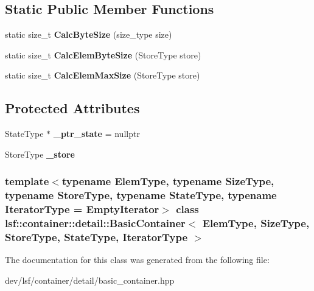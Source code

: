 \subsection*{Static Public Member Functions}
\begin{DoxyCompactItemize}
\item 
\hypertarget{classlsf_1_1container_1_1detail_1_1BasicContainer_afccd1538ff1ba8922ed600dcb570842d}{
static size\_\-t {\bfseries CalcByteSize} (size\_\-type size)}
\label{classlsf_1_1container_1_1detail_1_1BasicContainer_afccd1538ff1ba8922ed600dcb570842d}

\item 
\hypertarget{classlsf_1_1container_1_1detail_1_1BasicContainer_a11348ee3bb1cf14e62d5a4aa60496b2a}{
static size\_\-t {\bfseries CalcElemByteSize} (StoreType store)}
\label{classlsf_1_1container_1_1detail_1_1BasicContainer_a11348ee3bb1cf14e62d5a4aa60496b2a}

\item 
\hypertarget{classlsf_1_1container_1_1detail_1_1BasicContainer_a60a522de5fee2d35147dd22dd8908220}{
static size\_\-t {\bfseries CalcElemMaxSize} (StoreType store)}
\label{classlsf_1_1container_1_1detail_1_1BasicContainer_a60a522de5fee2d35147dd22dd8908220}

\end{DoxyCompactItemize}
\subsection*{Protected Attributes}
\begin{DoxyCompactItemize}
\item 
\hypertarget{classlsf_1_1container_1_1detail_1_1BasicContainer_af3f7a3e085a5dbae508d831e20306733}{
StateType $\ast$ {\bfseries \_\-ptr\_\-state} = nullptr}
\label{classlsf_1_1container_1_1detail_1_1BasicContainer_af3f7a3e085a5dbae508d831e20306733}

\item 
\hypertarget{classlsf_1_1container_1_1detail_1_1BasicContainer_a2d521bb99527fe8342029e55129a3537}{
StoreType {\bfseries \_\-store}}
\label{classlsf_1_1container_1_1detail_1_1BasicContainer_a2d521bb99527fe8342029e55129a3537}

\end{DoxyCompactItemize}
\subsubsection*{template$<$typename ElemType, typename SizeType, typename StoreType, typename StateType, typename IteratorType = EmptyIterator$>$ class lsf::container::detail::BasicContainer$<$ ElemType, SizeType, StoreType, StateType, IteratorType $>$}



The documentation for this class was generated from the following file:\begin{DoxyCompactItemize}
\item 
dev/lsf/container/detail/basic\_\-container.hpp\end{DoxyCompactItemize}
